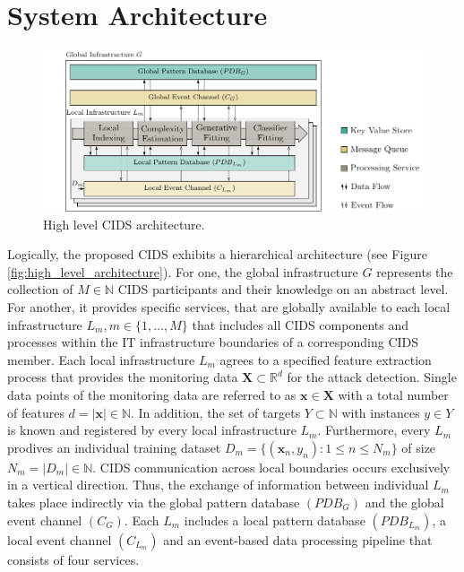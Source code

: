 \section{System Architecture} \label{sec:system_architecture}



\begin{figure}[b!]
    \centering
    \includegraphics[width=1\linewidth]{tikz/detailed_architecture.pdf}
    \caption{High level CIDS architecture.}
    \label{fig:detailed_architecture}
    \end{figure}

    
    Logically, the proposed CIDS exhibits a hierarchical architecture (see Figure \ref{fig:high_level_architecture}). For one, the global infrastructure $G$ represents the collection of $M \in \mathbb{N}$ CIDS participants and their knowledge on an abstract level. For another, it provides specific services, that are globally available to each local infrastructure $L_m, m \in \{1, \dots, M\}$ that includes all CIDS components and processes within the IT infrastructure boundaries of a corresponding CIDS member. Each local infrastructure $L_m$ agrees to a specified feature extraction process that provides the monitoring data $\bm{X} \subset \mathbb{R}^d$ for the attack detection. Single data points of the monitoring data are referred to as $\bm{x} \in \bm{X}$ with a total number of features $d = |\bm{x}| \in \mathbb{N}$. In addition, the set of targets $Y \subset \mathbb{N}$ with instances $y \in Y$ is known and registered by every local infrastructure $L_m$. Furthermore, every $L_m$ prodives an individual training dataset $D_m= \{(\bm{x}_n, y_n): 1 \leq n \leq N_m\}$ of size $N_m = |D_m| \in \mathbb{N}$. CIDS communication across local boundaries occurs exclusively in a vertical direction. Thus, the exchange of information between individual $L_m$ takes place indirectly via the global pattern database $(PDB_G)$ and the global event channel $(C_G)$. Each $L_m$ includes a local pattern database $(PDB_{L_m})$, a local event channel $(C_{L_m})$ and an event-based data processing pipeline that consists of four services.

